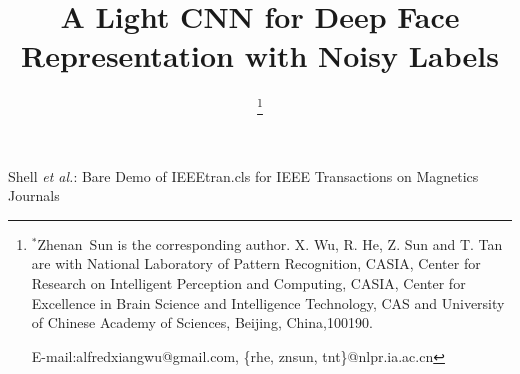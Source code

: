 \documentclass[journal,transmag]{IEEEtran}
\begin{document}
%
\title{A Light CNN for Deep Face Representation with Noisy Labels}




\author{
\thanks{
$^*$Zhenan~Sun is the corresponding author. X. Wu, R. He, Z. Sun and T. Tan are with National Laboratory of Pattern Recognition, CASIA, Center for Research on Intelligent Perception and Computing, CASIA, Center for Excellence in Brain Science and Intelligence Technology, CAS and University of Chinese Academy of Sciences, Beijing, China,100190.

E-mail:alfredxiangwu@gmail.com, \{rhe, znsun, tnt\}@nlpr.ia.ac.cn}}



%
{Shell \MakeLowercase{\textit{et al.}}: Bare Demo of IEEEtran.cls for IEEE Transactions on Magnetics Journals}
%







\end{document}
